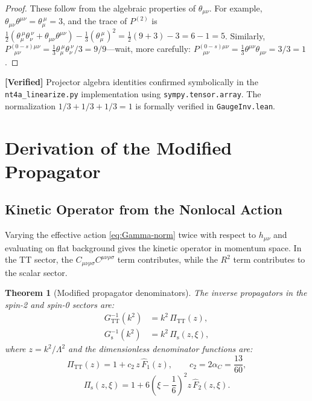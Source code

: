 \documentclass[11pt,a4paper]{article}
\newcommand{\Weylsq}{C_{\mu\nu\rho\sigma}C^{\mu\nu\rho\sigma}}
\theoremstyle{plain}
\newtheorem{theorem}{Theorem}[section]
\theoremstyle{definition}
\newcommand{\verified}[1]{%
  \par\smallskip\noindent
  \colorbox{green!10}{\parbox{\dimexpr\linewidth-2\fboxsep}{%
    \textcolor{green!50!black}{\textbf{[Verified]}} #1}}%
  \par\smallskip}
\begin{document}
\begin{proof}
These follow from the algebraic properties of $\theta_{\mu\nu}$.
For example, $\theta_{\mu\nu}\theta^{\mu\nu} = \theta_\mu^{\ \mu} = 3$,
and the trace of $P^{(2)}$ is
$\frac{1}{2}(\theta_\mu^{\ \mu}\theta_\nu^{\ \nu}
+ \theta_{\mu\nu}\theta^{\mu\nu}) - \frac{1}{3}(\theta_\mu^{\ \mu})^2
= \frac{1}{2}(9 + 3) - 3 = 6 - 1 = 5$.
Similarly, $P^{(0-s)\mu\nu}_{\ \ \ \mu\nu}
= \frac{1}{3}\theta_\mu^{\ \mu}\theta_\nu^{\ \nu}/3 = 9/9$---wait,
more carefully:
$P^{(0-s)\mu\nu}_{\ \ \ \mu\nu}
= \frac{1}{3}\theta^{\mu\nu}\theta_{\mu\nu} = 3/3 = 1$.
\end{proof}

\verified{Projector algebra identities confirmed symbolically
in the \texttt{nt4a\_linearize.py} implementation using
\texttt{sympy.tensor.array}. The normalization
$1/3 + 1/3 + 1/3 = 1$ is formally verified in
\texttt{GaugeInv.lean}.}

\section{Derivation of the Modified Propagator}\label{sec:propagator}

\subsection{Kinetic Operator from the Nonlocal Action}

Varying the effective action \cref{eq:Gamma-norm} twice with respect
to $h_{\mu\nu}$ and evaluating on flat background gives the kinetic
operator in momentum space. In the TT sector, the $\Weylsq$ term
contributes, while the $R^2$ term contributes to the scalar sector.

\begin{theorem}[Modified propagator denominators]\label{thm:propagator}
The inverse propagators in the spin-2 and spin-0 sectors are:
\begin{align}
  G^{-1}_{\mathrm{TT}}(k^2) &= k^2\, \Pi_{\mathrm{TT}}(z),
  \label{eq:G-inv-TT}\\
  G^{-1}_{\mathrm{s}}(k^2) &= k^2\, \Pi_{\mathrm{s}}(z,\xi),
  \label{eq:G-inv-s}
\end{align}
where $z = k^2/\Lambda^2$ and the dimensionless denominator functions
are:
\begin{equation}\label{eq:Pi-TT}
  \boxed{\Pi_{\mathrm{TT}}(z) = 1 + c_2\, z\, \hat{F}_1(z),
  \qquad c_2 = 2\alpha_C = \frac{13}{60},}
\end{equation}
\begin{equation}\label{eq:Pi-s}
  \boxed{\Pi_{\mathrm{s}}(z,\xi) = 1
  + 6\left(\xi - \frac{1}{6}\right)^2 z\, \hat{F}_2(z,\xi).}
\end{equation}
\end{theorem}
\end{document}
